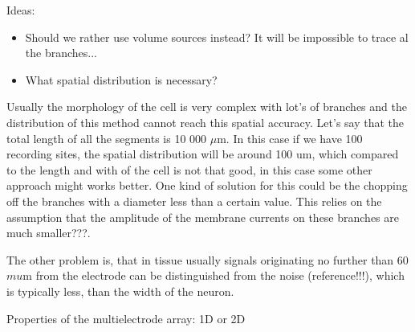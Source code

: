 \documentclass[12pt,a4paper]{article}
\begin{document}
Ideas:
\begin{itemize}
\item Should we rather use volume sources instead? It will be impossible to trace al the branches...
\item What spatial distribution is necessary? 
\end{itemize}

Usually the morphology of the cell is very complex with lot's  of branches and the distribution of this method cannot reach this spatial accuracy. Let's say that the total length of all the segments is 10 000 $\mu$m. In this case if we have 100 recording sites, the spatial distribution will be around 100 um, which compared to the length and with of the cell is not that good, in this case some other approach might works better. One kind of solution for this could be the chopping off the branches with a diameter less than a certain value. This relies on the assumption that the amplitude of the membrane currents on these branches are much smaller???.


The other problem is, that in tissue usually signals originating no further than 60 $mu$m from the electrode can be distinguished from the noise (reference!!!), which is typically  less, than the width of the neuron.

Properties of the multielectrode array:
1D or 2D


 



\end{document}
